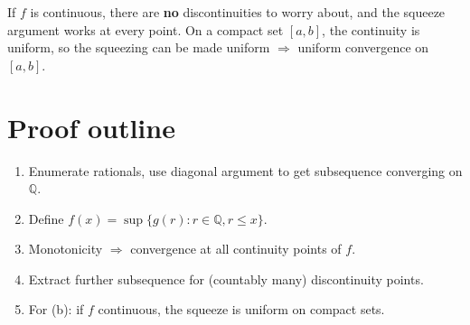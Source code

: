 \documentclass[12pt]{article}
\begin{document}
If $f$ is continuous, there are \textbf{no} discontinuities to worry about, and the squeeze argument works at every point. On a compact set $[a,b]$, the continuity is uniform, so the squeezing can be made uniform $\Rightarrow$ uniform convergence on $[a,b]$.

\section*{Proof outline}
\begin{enumerate}
    \item Enumerate rationals, use diagonal argument to get subsequence converging on $\mathbb{Q}$.
    \item Define $f(x) = \sup\{g(r) : r \in \mathbb{Q}, r \leq x\}$.
    \item Monotonicity $\Rightarrow$ convergence at all continuity points of $f$.
    \item Extract further subsequence for (countably many) discontinuity points.
    \item For (b): if $f$ continuous, the squeeze is uniform on compact sets.
\end{enumerate}
\end{document}
